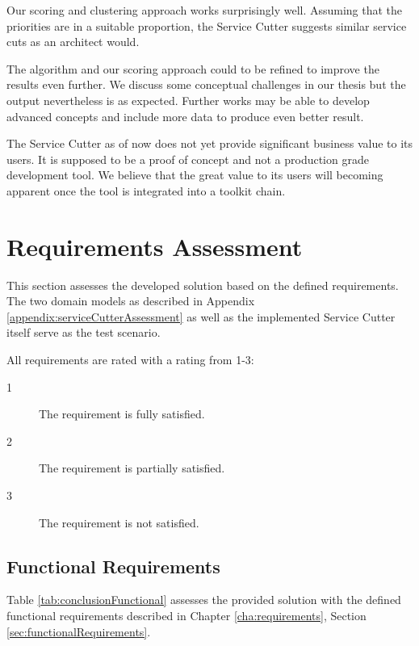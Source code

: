 Our scoring and clustering approach works surprisingly well. Assuming that the priorities are in a suitable proportion, the Service Cutter suggests similar service cuts as an architect would.


The algorithm and our scoring approach could to be refined to improve the results even further. We discuss some conceptual challenges in our thesis but the output nevertheless is as expected. Further works may be able to develop advanced concepts and include more data to produce even better result.

The Service Cutter as of now does not yet provide significant business value to its users. It is supposed to be a proof of concept and not a production grade development tool. We believe that the great value to its users will becoming apparent once the tool is integrated into a toolkit chain.

\section{Requirements Assessment}

This section assesses the developed solution based on the defined requirements. The two domain models as described in Appendix \ref{appendix:serviceCutterAssessment} as well as the implemented Service Cutter itself serve as the test scenario.

All requirements are rated with a rating from 1-3:

\begin{description}
\item[1] The requirement is fully satisfied.
\item[2] The requirement is partially satisfied.
\item[3] The requirement is not satisfied.
\end{description}

\subsection{Functional Requirements}

Table \ref{tab:conclusionFunctional} assesses the provided solution with the defined functional requirements described in Chapter \ref{cha:requirements}, Section \ref{sec:functionalRequirements}.


